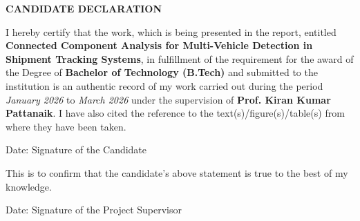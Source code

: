 \newpage
\begin{center}
{\large \bf CANDIDATE DECLARATION}
\end{center}
I hereby certify that the work, which is being presented in the report, entitled {\bf Connected Component Analysis for Multi-Vehicle Detection in Shipment Tracking Systems}, in fulfillment of the requirement for the award of the
Degree of {\bf Bachelor of Technology (B.Tech)} and submitted to the institution is an authentic record of my work carried out
during the period \emph{January 2026} to \emph{March 2026} under the supervision of {\bf Prof. Kiran Kumar Pattanaik}.
I have also cited the reference to the text(s)/figure(s)/table(s) from where they have been taken.

\vspace{0.6in}

Date: \hspace{3.5in} Signature of the Candidate

\vspace{0.2in}

This is to confirm that the candidate's above statement is true to the best of my knowledge.

\vspace{0.5in}

Date: \hspace{3.1in} Signature of the Project Supervisor
\vspace{.2in}
